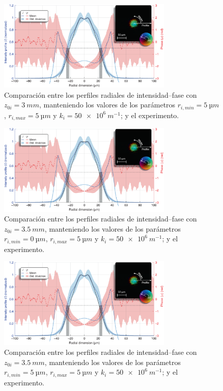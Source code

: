 \begin{figure}[htbp]
  \centering
  \includegraphics[width=0.74\textwidth]{Figuras/anx_cmp_26.png}
  \caption*{Comparación entre los perfiles radiales de intensidad--fase con $z_{0i}=\qty{3}{mm}$, manteniendo los valores de los parámetros $r_{i,min}=\qty{5}{µm}$, $r_{i,max}=\qty{5}{µm}$ y $k_{i}=\qty{50e6}{m^{-1}}$; y el experimento.}
\end{figure}

\begin{figure}[htbp]
  \centering
  \includegraphics[width=0.74\textwidth]{Figuras/anx_cmp_27.png}
  \caption*{Comparación entre los perfiles radiales de intensidad--fase con $z_{0i}=\qty{3.5}{mm}$, manteniendo los valores de los parámetros $r_{i,min}=\qty{0}{µm}$, $r_{i,max}=\qty{5}{µm}$ y $k_{i}=\qty{50e6}{m^{-1}}$; y el experimento.}
\end{figure}

\begin{figure}[htbp]
  \centering
  \includegraphics[width=0.74\textwidth]{Figuras/anx_cmp_28.png}
  \caption*{Comparación entre los perfiles radiales de intensidad--fase con $z_{0i}=\qty{3.5}{mm}$, manteniendo los valores de los parámetros $r_{i,min}=\qty{5}{µm}$, $r_{i,max}=\qty{5}{µm}$ y $k_{i}=\qty{50e6}{m^{-1}}$; y el experimento.}
\end{figure}

